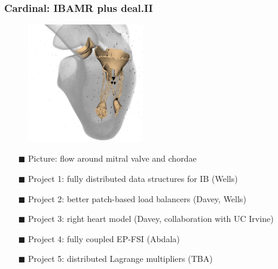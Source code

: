 \documentclass[8pt]{beamer}
\begin{document}
\begin{frame}
    \frametitle{Cardinal: IBAMR plus deal.II}
    \begin{figure}
        \centering
        \includegraphics[width=2in]{mitral.png}
    \end{figure}
    \begin{itemize}
        \item[$\blacksquare$] Picture: flow around mitral valve and chordae
        \item[$\blacksquare$] Project 1: fully distributed data structures for IB (Wells)
        \item[$\blacksquare$] Project 2: better patch-based load balancers (Davey, Wells)
        \item[$\blacksquare$] Project 3: right heart model (Davey, collaboration with UC Irvine)
        \item[$\blacksquare$] Project 4: fully coupled EP-FSI (Abdala)
        \item[$\blacksquare$] Project 5: distributed Lagrange multipliers (TBA)
    \end{itemize}
\end{frame}
\end{document}
